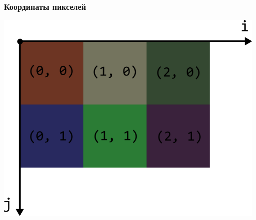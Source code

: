 \documentclass[10pt,pdf,hyperref={unicode}]{beamer}
\begin{document}

\begin{frame}[fragile]
\frametitle{Координаты пикселей} 
\begin{center}
\includegraphics[scale=0.65]{./images/image_coords.png}
\end{center}
\end{frame}
\end{document}
